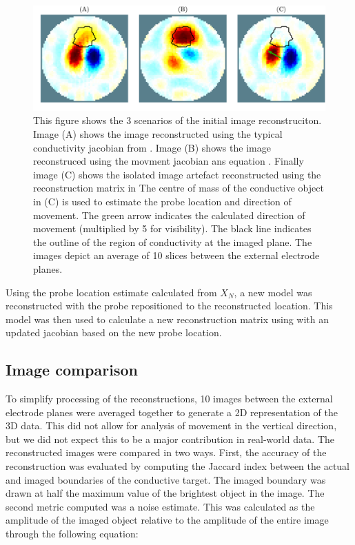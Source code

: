 \begin{figure}[H]
    \centering
   \includegraphics[width=\textwidth]{chapter7-internal_elec_motion/imgs/recon_methods.pdf} 
   \caption[Motion correction methods]{\label{fig:motion_correction_methods} 
   This figure shows the 3 scenarios of the initial image reconstruciton. 
   Image (A) shows the image reconstructed using the typical conductivity jacobian 
   from . Image (B) shows the image reconstruced using the movment 
   jacobian ans equation . Finally image (C) shows the 
   isolated image artefact reconstructed using the reconstruction matrix in 
	The centre of mass of the conductive object in (C) is used to
	estimate the probe location and direction of movement. The green arrow indicates the 
	calculated direction of movement (multiplied by 5 for visibility).
	The black line indicates the outline of the region of conductivity at the imaged plane.
	The images depict an average of 10 slices between the external electrode planes.}
\end{figure}

Using the probe location estimate calculated from $X_N$,
a new model was reconstructed with the probe repositioned 
to the reconstructed location. 
This model was then used to calculate a new reconstruction matrix 
using 
with an updated jacobian based on the new probe location. 


\subsection{Image comparison}
To simplify processing of the reconstructions, 10 images between the 
external electrode planes were averaged together to generate a 2D 
representation of the 3D data. This did not allow for analysis of movement in the vertical 
direction, but we did not expect this to be a major contribution in real-world data.
The reconstructed images were compared in two ways. First, the accuracy of the reconstruction
was evaluated by computing the Jaccard index \parencite{jaccard_distribution_1912} 
between the actual and imaged boundaries of the 
conductive target. The imaged boundary was drawn at half the maximum value of the brightest 
object in the image. The second metric computed was a noise estimate. This was calculated as
the amplitude of the imaged object relative to the amplitude of the entire image through the
following equation:

